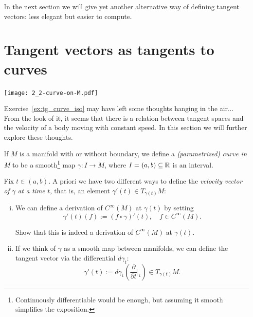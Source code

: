 In the next section we will give yet another alternative way of defining tangent vectors: less elegant but easier to compute.


\section{Tangent vectors as tangents to curves}

\begin{marginfigure}[1em]
  \texttt{[image: 2\_2-curve-on-M.pdf]}
\end{marginfigure}

Exercise~\ref{ex:tg_curve_iso} may have left some thoughts hanging in the air...
From the look of it, it seems that there is a relation between tangent spaces and the velocity of a body moving with constant speed.
In this section we will further explore these thoughts.

\begin{definition}
  If $M$ is a manifold with or without boundary, we define a \emph{(parametrized) curve in M} to be a smooth\footnote{Continuously differentiable would be enough, but assuming it smooth simplifies the exposition.} map $\gamma : I \to M$, where $I=(a,b)\subseteq\mathbb{R}$ is an interval.
\end{definition}

Fix $t\in(a,b)$.
A priori we have two different ways to define the \emph{velocity vector of $\gamma$ at a time $t$}, that is, an element $\gamma'(t) \in T_{\gamma(t)}M$:
\begin{enumerate}[(i)]
  \item We can define a derivation of $C^\infty(M)$ at $\gamma(t)$ by setting
        \begin{equation}\label{eq:tg_curve_der}
          \gamma'(t) (f) := (f\circ\gamma)'(t), \quad f\in C^\infty(M).
        \end{equation}
        \begin{exercise}
          Show that this is indeed a derivation of $C^\infty(M)$ at $\gamma(t)$.
        \end{exercise}
  \item If we think of $\gamma$ as a smooth map between manifolds, we can define the tangent vector via the differential $d\gamma_t$:
        \begin{equation}\label{eq:tg_curve_diff}
          \gamma'(t):= d\gamma_t\left(\frac{\partial}{\partial t}\Big|_t\right) \in T_{\gamma(t)}M.
        \end{equation}
\end{enumerate}

